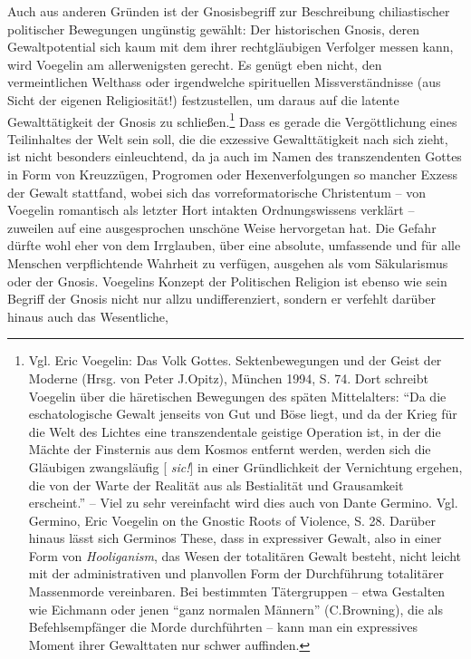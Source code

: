 Auch aus anderen Gründen ist der Gnosisbegriff zur Beschreibung chiliastischer
politischer Bewegungen ungünstig gewählt: Der historischen Gnosis, deren
Gewaltpotential sich kaum mit dem ihrer rechtgläubigen Verfolger messen kann,
wird Voegelin am allerwenigsten gerecht. Es genügt eben nicht, den
vermeintlichen Welthass oder irgendwelche spirituellen Missverständnisse (aus
Sicht der eigenen Religiosität!) festzustellen, um daraus auf die latente
Gewalttätigkeit der Gnosis zu schließen.\footnote{Vgl. Eric Voegelin: Das Volk
  Gottes. Sektenbewegungen und der Geist der Moderne (Hrsg. von Peter
  J.Opitz), München 1994, S. 74. Dort schreibt Voegelin über die häretischen
  Bewegungen des späten Mittelalters: "`Da die eschatologische Gewalt jenseits
  von Gut und Böse liegt, und da der Krieg für die Welt des Lichtes eine
  transzendentale geistige Operation ist, in der die Mächte der Finsternis aus
  dem Kosmos entfernt werden, werden sich die Gläubigen zwangsläufig [{\em
    sic!}]  in einer Gründlichkeit der Vernichtung ergehen, die von der Warte
  der Realität aus als Bestialität und Grausamkeit erscheint."' -- Viel zu
  sehr vereinfacht wird dies auch von Dante Germino. Vgl. Germino, Eric
  Voegelin on the Gnostic Roots of Violence, S. 28. Darüber hinaus lässt sich
  Germinos These, dass in expressiver Gewalt, also in einer Form von {\em
    Hooliganism}, das Wesen der totalitären Gewalt besteht, nicht leicht mit
  der administrativen und planvollen Form der Durchführung totalitärer
  Massenmorde vereinbaren.  Bei bestimmten Tätergruppen -- etwa Gestalten wie
  Eichmann oder jenen "`ganz normalen Männern"' (C.Browning), die als
  Befehlsempfänger die Morde durchführten -- kann man ein expressives Moment
  ihrer Gewalttaten nur schwer auf\/finden.} Dass es gerade die Vergöttlichung
eines Teilinhaltes der Welt sein soll, die die exzessive Gewalttätigkeit nach
sich zieht, ist nicht besonders einleuchtend, da ja auch im Namen des
transzendenten Gottes in Form von Kreuzzügen, Progromen oder Hexenverfolgungen
so mancher Exzess der Gewalt stattfand, wobei sich das vorreformatorische
Christentum -- von Voegelin romantisch als letzter Hort intakten
Ordnungswissens verklärt -- zuweilen auf eine ausgesprochen unschöne Weise
hervorgetan hat. Die Gefahr dürfte wohl eher von dem Irrglauben, über eine
absolute, umfassende und für alle Menschen verpflichtende Wahrheit zu
verfügen, ausgehen als vom Säkularismus oder der Gnosis. Voegelins Konzept der
Politischen Religion ist ebenso wie sein Begriff der Gnosis nicht nur allzu
undifferenziert, sondern er verfehlt darüber hinaus auch das Wesentliche,

